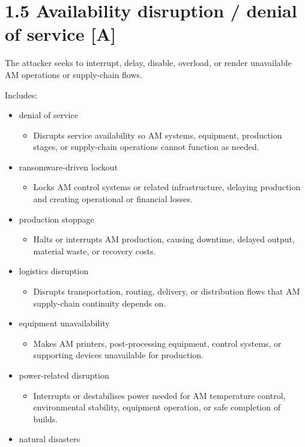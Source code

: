 \documentclass[10pt,a4paper,oneside]{report}
\begin{document}
\section{1.5 Availability disruption / denial of service [A]}


The attacker seeks to interrupt, delay, disable, overload, or render unavailable AM operations or supply-chain flows.

Includes:

\begin{itemize}
\item denial of service
\begin{itemize}
\item Disrupts service availability so AM systems, equipment, production stages, or supply-chain operations cannot function as needed.
\end{itemize}
\item ransomware-driven lockout
\begin{itemize}
\item Locks AM control systems or related infrastructure, delaying production and creating operational or financial losses.
\end{itemize}
\item production stoppage
\begin{itemize}
\item Halts or interrupts AM production, causing downtime, delayed output, material waste, or recovery costs.
\end{itemize}
\item logistics disruption
\begin{itemize}
\item Disrupts transportation, routing, delivery, or distribution flows that AM supply-chain continuity depends on.
\end{itemize}
\item equipment unavailability
\begin{itemize}
\item Makes AM printers, post-processing equipment, control systems, or supporting devices unavailable for production.
\end{itemize}
\item power-related disruption
\begin{itemize}
\item Interrupts or destabilises power needed for AM temperature control, environmental stability, equipment operation, or safe completion of builds.
\end{itemize}
\item natural disasters

\end{itemize}
\end{document}
